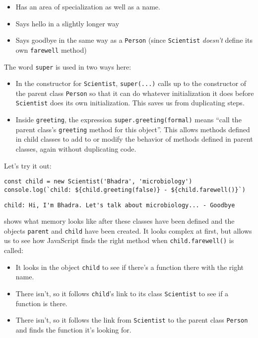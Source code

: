 \begin{itemize}
\item
  Has an area of specialization as well as a name.
\item
  Says hello in a slightly longer way
\item
  Says goodbye in the same way as a \texttt{Person}
  (since \texttt{Scientist} \emph{doesn't} define its own \texttt{farewell} method)
\end{itemize}

The word \texttt{super} is used in two ways here:

\begin{itemize}
\item
  In the constructor for \texttt{Scientist},
  \texttt{super(...)} calls up to the constructor of the parent class \texttt{Person}
  so that it can do whatever initialization it does
  before \texttt{Scientist} does its own initialization.
  This saves us from duplicating steps.
\item
  Inside \texttt{greeting},
  the expression \texttt{super.greeting(formal)} means
  ``call the parent class's \texttt{greeting} method for this object''.
  This allows methods defined in child classes to add to or modify
  the behavior of methods defined in parent classes,
  again without duplicating code.
\end{itemize}

Let's try it out:

\begin{verbatim}
const child = new Scientist('Bhadra', 'microbiology')
console.log(`child: ${child.greeting(false)} - ${child.farewell()}`)
\end{verbatim}

\begin{verbatim}
child: Hi, I'm Bhadra. Let's talk about microbiology... - Goodbye
\end{verbatim}

 shows what memory looks like after these classes have been defined
and the objects \texttt{parent} and \texttt{child} have been created.
It looks complex at first,
but allows us to see how JavaScript finds the right method
when \texttt{child.farewell()} is called:

\begin{itemize}
\item
  It looks in the object \texttt{child} to see if there's a function there with the right name.
\item
  There isn't, so it follows \texttt{child}'s link to its class \texttt{Scientist}
  to see if a function is there.
\item
  There isn't, so it follows the link from \texttt{Scientist} to the parent class \texttt{Person}
  and finds the function it's looking for.
\end{itemize}

